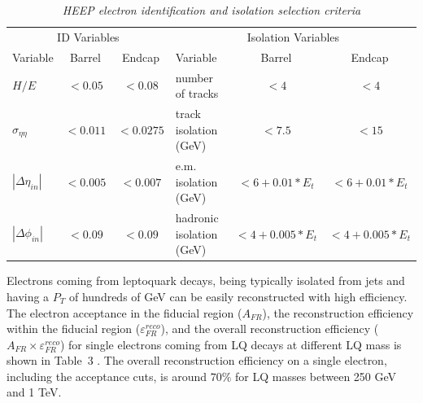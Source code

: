 \documentclass{cmspaper}
\begin{document}
\begin{linenumbers}

\begin{table}[htbp]
  \label{tab:HEEPselection}
  \begin{center}
    \begin{tabular}{|lcc|lcc|} \hline
      \multicolumn{3}{|c|}{ID Variables} & \multicolumn{3}{|c|}{Isolation Variables} \\ 
      Variable & Barrel & Endcap & Variable & Barrel & Endcap  \\ \hline
      $H/E$  & $<0.05$ & $<0.08$ & number of tracks  & $<4$ & $<4$ \\ \hline
      $\sigma_{\eta\eta}$  & $<0.011$ & $<0.0275$ & track isolation (GeV) & $<7.5$ & $<15$ \\ \hline
      $|\Delta\eta_{in}|$  & $<0.005$ & $<0.007$ & e.m. isolation (GeV) & $<6+0.01*E_{t}$ & $<6+0.01*E_{t}$ \\ \hline
      $|\Delta\phi_{in}|$  & $<0.09$ & $<0.09$ & hadronic isolation (GeV) & $<4+0.005*E_{t}$ & $<4+0.005*E_{t}$ \\ \hline
    \end{tabular}
  \caption{\small \sl HEEP electron identification and isolation selection criteria}
  \end{center}
\end{table}

Electrons coming from leptoquark decays, 
being typically isolated from jets and having a $P_{T}$ of hundreds of GeV can be easily reconstructed with high efficiency. 
The electron acceptance in the fiducial region ($A_{FR}$), the 
reconstruction efficiency within the fiducial region ($\varepsilon_{FR}^{reco}$), and the overall reconstruction efficiency 
($A_{FR} \times \varepsilon_{FR}^{reco}$) for single electrons coming from LQ decays at different LQ mass is shown in Table~3
.
The overall reconstruction efficiency on a single electron, including the acceptance cuts, is around $70\%$ for LQ masses between 250 GeV and 1 TeV.


\end{linenumbers}
\end{document}
